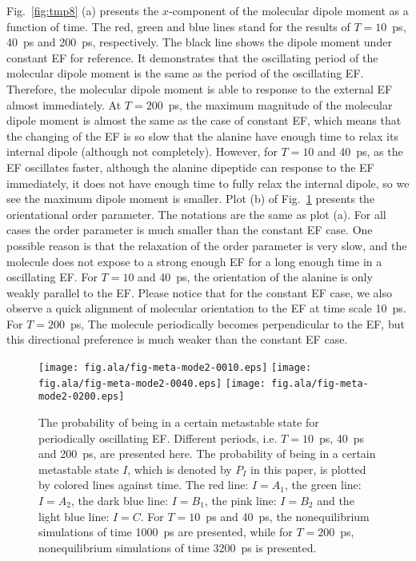 \documentclass[a4paper,preprint,unsortedaddress,onecolumn]{revtex4-1}
\begin{document}
Fig.~\ref{fig:tmp8} (a)
presents the $x$-component of the molecular dipole moment as
a function of time. The red, green and blue lines stand for the
results of $T=10$~ps, 40~ps and 200~ps, respectively. The black line
shows the dipole moment under constant EF
for reference.
It demonstrates that the oscillating period of the molecular dipole moment
is the same as the period of the oscillating EF. Therefore,
the molecular dipole moment
is able to response to the external EF almost immediately.
At $T=200$~ps, the maximum magnitude of the molecular
dipole moment is almost the same as the case of constant EF, which
means that the changing of the EF is so slow that the
alanine have enough time to 
relax its internal dipole (although not completely). However,
for $T=10$ and 40~ps, as the EF oscillates faster,
although the alanine dipeptide can response to the EF immediately,
it does not have enough time to fully relax the internal dipole, so we
see the maximum dipole moment is smaller.
Plot (b) of Fig.~\ref{fig:tmp9} presents the orientational order
parameter. The notations are the same as plot (a).
For all cases the order parameter is much
smaller than the constant EF case. One possible reason is that the
relaxation of the order parameter is very slow, and the molecule does
not expose to a strong enough EF for a long enough time in a oscillating
EF. For  $T=10$ and 40~ps, the orientation of the alanine is only weakly
parallel to the EF. Please notice that for the constant EF case,
we also observe a quick alignment of molecular orientation to the EF
at time scale 10~ps. For $T=200$~ps, The molecule periodically
becomes perpendicular to the EF, but this directional preference is much
weaker than the constant EF case.

\begin{figure}
  \centering
  \texttt{[image: fig.ala/fig-meta-mode2-0010.eps]}
  \texttt{[image: fig.ala/fig-meta-mode2-0040.eps]}
  \texttt{[image: fig.ala/fig-meta-mode2-0200.eps]}
  \caption{ The probability of being in a certain metastable state for
    periodically oscillating EF. Different periods,
    i.e. $T=10$~ps, 40~ps and 200~ps, are presented here.  The
    probability of being in a certain metastable state $I$, which is
    denoted by $P_I$ in this paper, is plotted by colored lines against
    time. The red line: $I = A_1$, the green line: $I = A_2$, the dark
    blue line: $I = B_1$, the pink line: $I = B_2$ and the light blue
    line: $I = C$. For $T=10$~ps and 40~ps, the nonequilibrium
    simulations of time 1000~ps are presented, while for $T=200$~ps,
    nonequilibrium simulations of time 3200~ps is presented.  }
  \label{fig:tmp9}
\end{figure}
\end{document}
